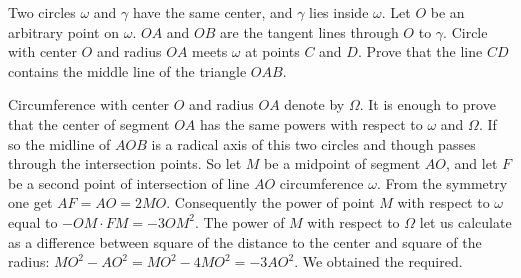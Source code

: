 \problem
Two circles $\omega$ and $\gamma$ have the same center, and $\gamma$ lies
inside $\omega$.
Let $O$ be an arbitrary point on $\omega$.
$OA$ and $OB$ are the tangent lines through $O$ to $\gamma$.
Circle with center $O$ and radius $OA$ meets $\omega$ at points $C$ and $D$.
Prove that the line $CD$ contains the middle line of the triangle $OAB$.

\solution
Circumference with center $O$ and radius $OA$ denote by $\Omega$. It is enough to prove that the center of segment $OA$ has the same powers with respect to $\omega$ and $\Omega$. If so the midline of $AOB$ is a radical axis of this two circles and though passes through the intersection points. So let $M$ be a midpoint of segment $AO$, and let $F$ be a second point of intersection of line $AO$ circumference $\omega$. From the symmetry one get $AF=AO=2MO$. Consequently the power of point $M$ with respect to $\omega$ equal to $-OM\cdot FM=-3OM^2$. The power of $M$ with respect to $\Omega$ let us calculate as a difference between square of the distance to the center and square of the radius: $MO^2-AO^2=MO^2-4MO^2=-3AO^2$. We obtained the required.
\endproblem
